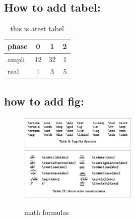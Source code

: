 \documentclass{article} %
\begin{document}
        \subsection{How to add tabel:}
        \begin{table}[h!]
            \centering
            \caption{this is atest tabel}
            \label{LABEL_TABLE_1}
            \begin{tabular}{||l|c|c|r||}
                \hline phase & 0 & 1 & 2 \\
                \hline\hline ampli & 12 & 32 & 1 \\
                real & 1 & 3 & 5 \\
                \hline
            \end{tabular}
        \end{table}

        \subsection{how to add fig:}
        
        \begin{figure}[hbt!]
            \centering
            \includegraphics[width=0.5\textwidth]{pics/math_1.png}
            \includegraphics[width=0.5\textwidth]{pics/math_2.png}
            \caption{math formulas}
        \end{figure}

\end{document}
